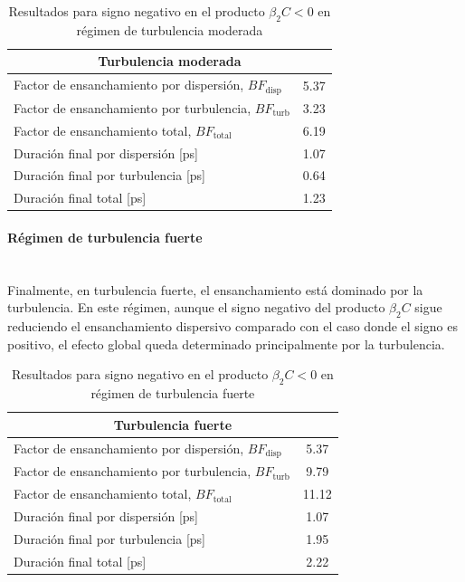 \begin{table}[H]
\centering
\hspace*{-0.6cm}
\renewcommand{\arraystretch}{1.2}
\begin{tabular}{|l|c|}
\hline
\multicolumn{2}{|c|}{\textbf{Turbulencia moderada}} \\
\hline
Factor de ensanchamiento por dispersión, $BF_{\mathrm{disp}}$ & 5.37 \\
Factor de ensanchamiento por turbulencia, $BF_{\mathrm{turb}}$ & 3.23 \\
Factor de ensanchamiento total, $BF_{\mathrm{total}}$ & 6.19 \\
\hline
Duración final por dispersión [ps] & 1.07 \\
Duración final por turbulencia [ps] & 0.64 \\
Duración final total [ps] & 1.23 \\
\hline
\end{tabular}
\caption{Resultados para signo negativo en el producto $\beta_2 C < 0$ en régimen de turbulencia moderada}
\label{tabla_atm_signo_moderada_Cneg}
\end{table}


\paragraph{Régimen de turbulencia fuerte}\\
Finalmente, en turbulencia fuerte, el ensanchamiento está dominado por la turbulencia. En este régimen, aunque el signo negativo del producto $\beta_2C$ sigue reduciendo el ensanchamiento dispersivo comparado con el caso donde el signo es positivo, el efecto global queda determinado principalmente por la turbulencia.

\begin{table}[H]
\centering
\hspace*{-0.6cm}
\renewcommand{\arraystretch}{1.2}
\begin{tabular}{|l|c|}
\hline
\multicolumn{2}{|c|}{\textbf{Turbulencia fuerte}} \\
\hline
Factor de ensanchamiento por dispersión, $BF_{\mathrm{disp}}$ & 5.37 \\
Factor de ensanchamiento por turbulencia, $BF_{\mathrm{turb}}$ & 9.79 \\
Factor de ensanchamiento total, $BF_{\mathrm{total}}$ & 11.12 \\
\hline
Duración final por dispersión [ps] & 1.07 \\
Duración final por turbulencia [ps] & 1.95 \\
Duración final total [ps] & 2.22 \\
\hline
\end{tabular}
\caption{Resultados para signo negativo en el producto $\beta_2 C < 0$ en régimen de turbulencia fuerte}
\label{tabla_atm_signo_fuerte_Cneg}
\end{table}


